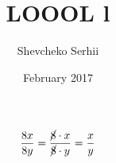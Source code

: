 \documentclass[12pt, letterpaper, twoside]{article}
\title{LOOOL l}
\author{Shevcheko Serhii}
\date{February 2017}
\begin{document}
\maketitle
\[\frac{8x}{8y}=\frac{\cancel{8}\cdot{x}}{\cancel{8}\cdot{y}}=\frac{x}{y}\]
\end{document}
